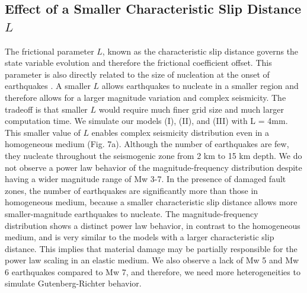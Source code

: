 \documentclass[11pt]{article}
\begin{document}
\subsection{Effect of a Smaller Characteristic Slip Distance $L$}
The frictional parameter $L$, known as the characteristic slip distance governs the state variable evolution and therefore the frictional coefficient offset. This parameter is also directly related to the size of nucleation at the onset of earthquakes \citep{rubin_ampuero_2005}. A smaller $L$ allows earthquakes to nucleate in a smaller region and therefore allows for a larger magnitude variation and complex seismicity. The tradeoff is that smaller $L$ would require much finer grid size and much larger computation time. We simulate our models (I), (II), and (III) with L = 4mm. This smaller value of $L$ enables complex seismicity distribution even in a homogeneous medium (Fig. 7a). Although the number of earthquakes are few, they nucleate throughout the seismogenic zone from 2 km to 15 km depth. We do not observe a power law behavior of the magnitude-frequency distribution despite having a wider magnitude range of Mw 3-7. In the presence of damaged fault zones, the number of earthquakes are significantly more than those in homogeneous medium, because a smaller characteristic slip distance allows more smaller-magnitude earthquakes to nucleate. The magnitude-frequency distribution shows a distinct power law behavior, in contrast to the homogeneous medium, and is very similar to the models with a larger characteristic slip distance. This implies that material damage may be partially responsible for the power law scaling in an elastic medium. We also observe a lack of Mw 5 and Mw 6 earthquakes compared to Mw 7, and therefore, we need more heterogeneities to simulate Gutenberg-Richter behavior. 
\end{document}
